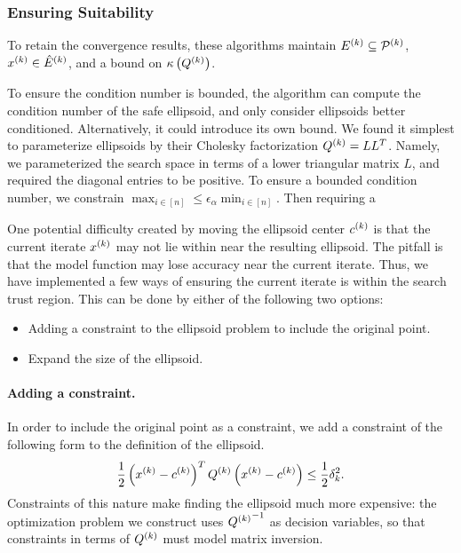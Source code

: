 \subsubsection{Ensuring Suitability}

To retain the convergence results, these algorithms maintain ${E^{(k)}} \subseteq {{\mathcal{P}}^{(k)}}$,
$x^{(k)} \in {{\hat E}^{(k)}} $, and a bound on ${\kappa}\left({Q^{(k)}}\right)$.

To ensure the condition number is bounded, the algorithm can compute the condition number of the safe ellipsoid, and only consider ellipsoids better conditioned.
Alternatively, it could introduce its own bound.
We found it simplest to parameterize ellipsoids by their Cholesky factorization ${Q^{(k)}} = LL^T$.
Namely, we parameterized the search space in terms of a lower triangular matrix $L$, and required the diagonal entries to be positive.
To ensure a bounded condition number, we constrain  $\max_{i\in[n]} \le \epsilon_{\alpha} \min_{i \in [n]}$.
Then requiring a 

One potential difficulty created by moving the ellipsoid center $c^{(k)}$ is that the current iterate $x^{(k)}$ may not lie within near the resulting ellipsoid.   
The pitfall is that the model function may lose accuracy near the current iterate.
Thus, we have implemented a few ways of ensuring the current iterate is within the search trust region.
This can be done by either of the following two options:
\begin{itemize}
\item Adding a constraint to the ellipsoid problem to include the original point.
\item Expand the size of the ellipsoid.
\end{itemize}

\paragraph*{Adding a constraint.}
In order to include the original point as a constraint, we add a constraint of the following form to the definition of the ellipsoid.
\begin{align*}
\frac 1 2 \left(x^{(k)} - c^{(k)}\right)^T{Q^{(k)}}\left(x^{(k)} - c^{(k)}\right) \le \frac 1 2 \delta_k^2.
\end{align*}
Constraints of this nature make finding the ellipsoid much more expensive:
the optimization problem we construct uses ${{Q^{(k)}}}^{-1}$ as decision variables, so that constraints in terms of ${Q^{(k)}}$ must model matrix inversion.

